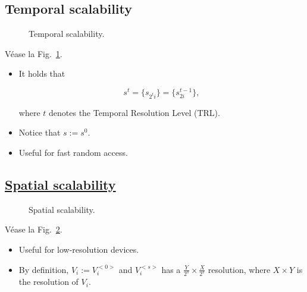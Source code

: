 \subsection{Temporal scalability}
\begin{figure}
  \caption{Temporal scalability.}
  \label{fig:temporal-scalability}
\end{figure}

Véase la Fig.~\ref{fig:temporal-scalability}.

\begin{itemize}
\item
  It holds that

  \begin{equation}
    s^{t}=\{s_{2^t i}\}=\{s_{2i}^{t-1}\},
  \end{equation}

  where $t$ denotes the Temporal Resolution Level (TRL).
\item
  Notice that $s:=s^{0}$.
\item
  Useful for fast random access.
\end{itemize}

%
%

\subsection{\href{http://inst.eecs.berkeley.edu/~ee290t/sp04/lectures/videowavelet_UCB1-3.pdf}{Spatial scalability}}

\begin{figure}
  \caption{Spatial scalability.}
  \label{fig:spatial-scalability}
\end{figure}

Véase la Fig.~\ref{fig:spatial-scalability}.

\begin{itemize}
\item
  Useful for low-resolution devices.
\item
  By definition, $V_i:=V_i^{<0>}$ and $V_i^{<s>}$ has a
  $\frac{Y}{2^s}\times \frac{X}{2^s}$ resolution, where $X\times Y$
  is the resolution of $V_i$.
\end{itemize}



